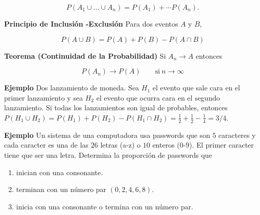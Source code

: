 \documentclass{article}\usepackage[]{graphicx}\usepackage[]{color}
\begin{document}
\[
P(A_1 \cup \dots \cup A_n) = P(A_1) + \cdots P(A_n).
\]

\textbf{Principio de Inclusi\'on -Exclusi\'on} Para dos eventos $A$ y $B$,

\[
P(A\cup B) = P(A) + P(B) -P(A \cap B)
\]

\textbf{Teorema (Continuidad de la Probabilidad)} Si $A_n \rightarrow A $ entonces 

\[
P(A_n) \rightarrow P(A)  \qquad \mbox{si} \  n \rightarrow \infty
\]


\vspace{0.3cm}

\textbf{Ejemplo} Dos lanzamiento de moneda. Sea $H_1$ el evento que sale cara en el primer lanzamiento y sea $H_2$ el evento que ocurra cara en el segundo lanzamiento. Si todas los lanzamientos son igual de probables, entonces $P(H_1 \cup H_2) = P(H_1) + P(H_2) - P(H_1 \cap H_2) = \frac{1}{2} + \frac{1}{2} - \frac{1}{4} = 3/4$.


\vspace{0.5cm}




\textbf{Ejemplo} Un sistema de una computadora usa passwords que son $5$ caracteres y cada caracter es una de las $26$ letras (a-z) o $10$ enteros (0-9). El primer caracter tiene que ser una letra. Determina la proporci\'on de passwords que

\begin{enumerate}
\item inician con una consonante.
\item terminan con un n\'umero par $(0,2,4,6,8)$.
\item inicia con una consonante o termina con un n\'umero par.
\end{enumerate}

\vspace{0.3cm}
\end{document}
